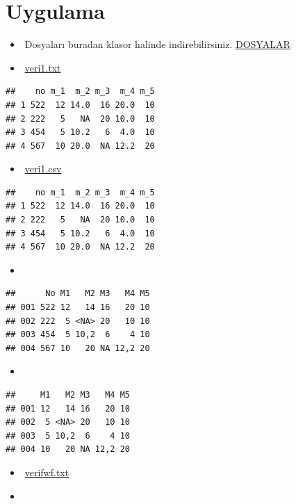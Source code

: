\documentclass[
  oneside]{book}
\providecommand{\tightlist}{%
  \setlength{\itemsep}{0pt}\setlength{\parskip}{0pt}}
\begin{document}
\hypertarget{uygulama}{%
\section{Uygulama}\label{uygulama}}

\begin{itemize}
\item
  🔗Dosyaları buradan klasor halinde indirebilirsiniz. \href{import/import.rar}{DOSYALAR}
\item
  🔗\href{import/veri1.txt}{veri1.txt}
\end{itemize}

\begin{verbatim}
##    no m_1  m_2 m_3  m_4 m_5
## 1 522  12 14.0  16 20.0  10
## 2 222   5   NA  20 10.0  10
## 3 454   5 10.2   6  4.0  10
## 4 567  10 20.0  NA 12.2  20
\end{verbatim}

\begin{itemize}
\tightlist
\item
  🔗\href{import/veri1.csv}{veri1.csv}
\end{itemize}

\begin{verbatim}
##    no m_1  m_2 m_3  m_4 m_5
## 1 522  12 14.0  16 20.0  10
## 2 222   5   NA  20 10.0  10
## 3 454   5 10.2   6  4.0  10
## 4 567  10 20.0  NA 12.2  20
\end{verbatim}

\begin{itemize}
\tightlist
\item
\end{itemize}

\begin{verbatim}
##      No M1   M2 M3   M4 M5
## 001 522 12   14 16   20 10
## 002 222  5 <NA> 20   10 10
## 003 454  5 10,2  6    4 10
## 004 567 10   20 NA 12,2 20
\end{verbatim}

\begin{itemize}
\tightlist
\item
\end{itemize}

\begin{verbatim}
##     M1   M2 M3   M4 M5
## 001 12   14 16   20 10
## 002  5 <NA> 20   10 10
## 003  5 10,2  6    4 10
## 004 10   20 NA 12,2 20
\end{verbatim}

\begin{itemize}
\tightlist
\item
  🔗\href{import/fwf.txt}{verifwf.txt}
\item
\end{itemize}
\end{document}
